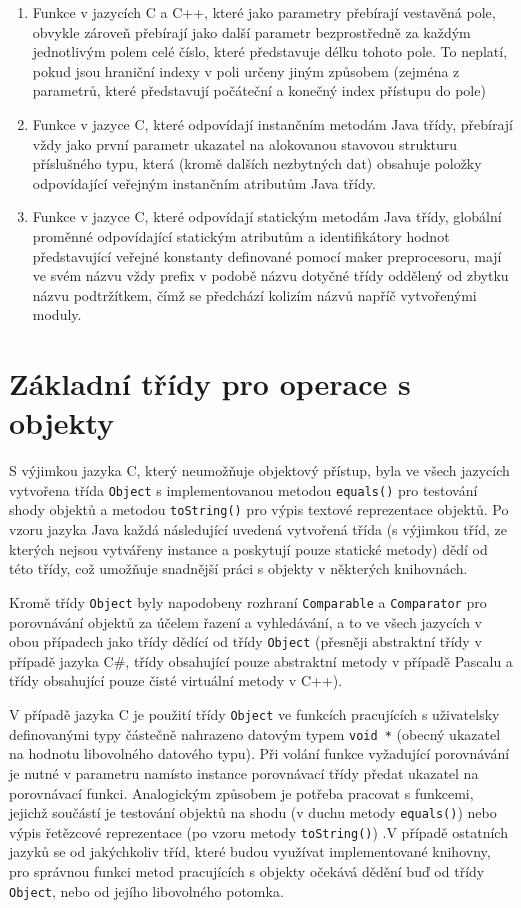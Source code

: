 \documentclass[onepage, a4paper, 12pt]{bakalarka}
\begin{document}
\begin{enumerate}
\item{Funkce v jazycích C a C++, které jako parametry přebírají vestavěná pole, obvykle zároveň přebírají jako další parametr bezprostředně za každým jednotlivým polem celé číslo, které představuje délku tohoto pole. To neplatí, pokud jsou hraniční indexy v poli určeny jiným způsobem (zejména z parametrů, které představují počáteční a konečný index přístupu do pole)}
\item{Funkce v jazyce C, které odpovídají instančním metodám Java třídy, přebírají vždy jako první parametr ukazatel na alokovanou stavovou strukturu příslušného typu, která (kromě dalších nezbytných dat) obsahuje položky odpovídající veřejným instančním atributům Java třídy.}
\item{Funkce v jazyce C, které odpovídají statickým metodám Java třídy, globální proměnné odpovídající statickým atributům a identifikátory hodnot představující veřejné konstanty definované pomocí maker preprocesoru, mají ve svém názvu vždy prefix v podobě názvu dotyčné třídy oddělený od zbytku názvu podtržítkem, čímž se předchází kolizím názvů napříč vytvořenými moduly.}
\end{enumerate}

\section{Základní třídy pro operace s objekty}
S výjimkou jazyka C, který neumožňuje objektový přístup, byla ve všech jazycích vytvořena třída \texttt{Object} s implementovanou metodou \texttt{equals()} pro testování shody objektů a metodou \texttt{toString()} pro výpis textové reprezentace objektů. Po vzoru jazyka Java každá následující uvedená vytvořená třída (s výjimkou tříd, ze kterých nejsou vytvářeny instance a poskytují pouze statické metody) dědí od této třídy, což umožňuje snadnější práci s objekty v některých knihovnách.\par
Kromě třídy \texttt{Object} byly napodobeny rozhraní \texttt{Comparable} a \texttt{Comparator} pro porovnávání objektů za účelem řazení a vyhledávání, a to ve všech jazycích v obou případech jako třídy dědící od třídy \texttt{Object} (přesněji abstraktní třídy v případě jazyka C\#, třídy obsahující pouze abstraktní metody v případě Pascalu a třídy obsahující pouze čisté virtuální metody v C++).\par
V případě jazyka C je použití třídy \texttt{Object} ve funkcích pracujících s uživatelsky definovanými typy částečně nahrazeno datovým typem \texttt{void *} (obecný ukazatel na hodnotu libovolného datového typu). Při volání funkce vyžadující porovnávání je nutné v parametru namísto instance porovnávací třídy předat ukazatel na porovnávací funkci. Analogickým způsobem je potřeba pracovat s funkcemi, jejichž součástí je testování objektů na shodu (v duchu metody \texttt{equals()}) nebo výpis řetězcové reprezentace (po vzoru metody \texttt{toString()}) .V případě ostatních jazyků se od jakýchkoliv tříd, které budou využívat implementované knihovny, pro správnou funkci metod pracujících s objekty očekává dědění buď od třídy \texttt{Object}, nebo od jejího libovolného potomka.
\end{document}
